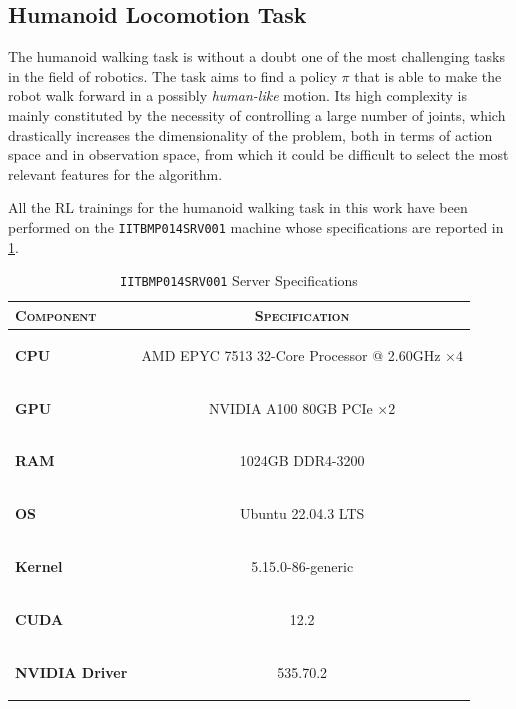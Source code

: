 \subsection{Humanoid Locomotion Task}
The humanoid walking task is without a doubt one of the most challenging tasks in the field of robotics. The task aims to find a policy $\pi$ that is able to make the robot walk forward in a possibly \textit{human-like} motion. Its high complexity is mainly constituted by the necessity of controlling a large number of joints, which drastically increases the dimensionality of the problem, both in terms of action space and in observation space, from which it could be difficult to select the most relevant features for the algorithm.

All the \ac{RL} trainings for the humanoid walking task in this work have been performed on the \texttt{IITBMP014SRV001} machine whose specifications are reported in \cref{tab:srv001}.

\begin{table}[h]
    \centering
    \label{tab:srv001}
    \caption{\texttt{IITBMP014SRV001} Server Specifications}
    \begin{tabular}[h]{l c}
        \toprule
        \textsc{Component}     & \textsc{Specification}                                                       \\
        \midrule
        \textbf{CPU}           & \begin{small}AMD EPYC 7513 32-Core Processor @ 2.60GHz $\times 4$\end{small} \\
        \textbf{GPU}           & \begin{small}NVIDIA A100 80GB PCIe       $\times 2$             \end{small}  \\
        \textbf{RAM}           & \begin{small}1024GB DDR4-3200                         \end{small}            \\
        \textbf{OS}            & \begin{small}Ubuntu 22.04.3 LTS                       \end{small}            \\
        \textbf{Kernel}        & \begin{small}5.15.0-86-generic                        \end{small}            \\
        \textbf{CUDA}          & \begin{small}12.2                                  \end{small}               \\
        \textbf{NVIDIA Driver} & \begin{small}535.70.2                             \end{small}                \\
        \bottomrule
    \end{tabular}
\end{table}

